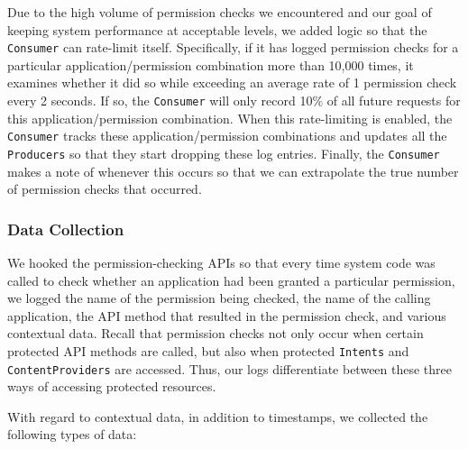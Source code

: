\documentclass[letterpaper,twocolumn,10pt]{article}
\begin{document}
Due to the high volume of permission checks we encountered and our goal of keeping system performance at acceptable levels, we added logic so that the {\tt Consumer} can rate-limit itself. Specifically, if it has logged permission checks for a particular application/permission combination more than 10,000 times, it examines whether it did so while exceeding an average rate of 1 permission check every 2 seconds. If so, the {\tt Consumer} will only record 10\% of all future requests for this application/permission combination. When this rate-limiting is enabled, the {\tt Consumer} tracks these application/permission combinations and updates all the {\tt Producers} so that they start dropping these log entries. Finally, the {\tt Consumer} makes a note of whenever this occurs so that we can extrapolate the true number of permission checks that occurred.
 
 







\subsubsection{Data Collection}
\label{sec:collection}

We hooked the permission-checking APIs so that every time system code was called to check whether an application had been granted a particular permission, we logged the name of the permission being checked, the name of the calling application, the API method that resulted in the permission check, and various contextual data. Recall that permission checks not only occur when certain protected API methods are called, but also when protected {\tt Intents} and {\tt ContentProviders} are accessed. Thus, our logs differentiate between these three ways of accessing protected resources.



With regard to contextual data, in addition to timestamps, we collected the following types of data:
\end{document}
